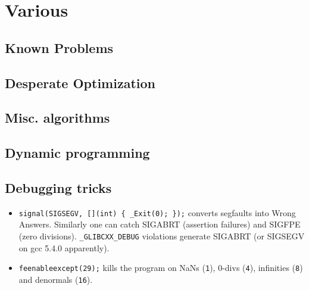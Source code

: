\chapter{Various}

\section{Known Problems}

\section{Desperate Optimization}


\section{Misc. algorithms}

\section{Dynamic programming}

\section{Debugging tricks}
\begin{itemize}
	\item \texttt{signal(SIGSEGV, [](int) \{ \_Exit(0); \});} converts segfaults into Wrong Answers.
	      Similarly one can catch SIGABRT (assertion failures) and SIGFPE (zero divisions).
	      \texttt{\_GLIBCXX\_DEBUG} violations generate SIGABRT (or SIGSEGV on gcc 5.4.0 apparently).
	\item \texttt{feenableexcept(29);} kills the program on NaNs (\texttt 1), 0-divs (\texttt 4), infinities (\texttt 8) and denormals (\texttt{16}).
\end{itemize}

